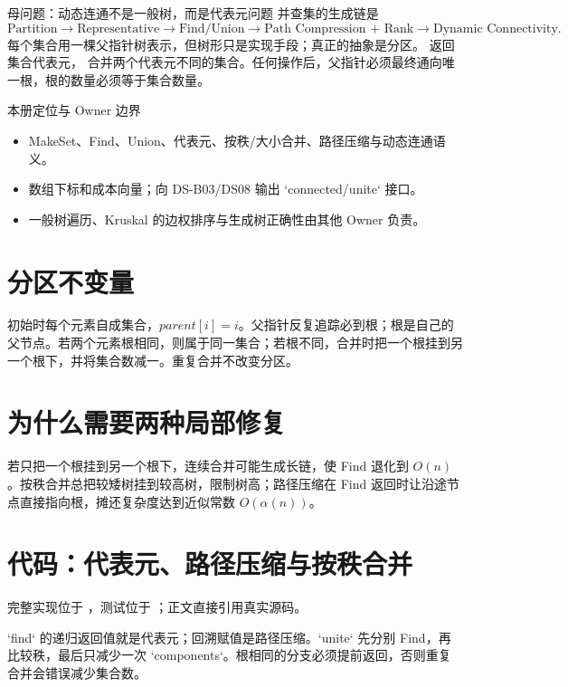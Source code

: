 \documentclass[UTF8,fontset=none,11pt,a4paper]{ctexart}
\begin{document}

\begin{corebox}{母问题：动态连通不是一般树，而是代表元问题}
并查集的生成链是
\[
\text{Partition}\to\text{Representative}\to\text{Find/Union}\to\text{Path Compression + Rank}\to\text{Dynamic Connectivity}.
\]
每个集合用一棵父指针树表示，但树形只是实现手段；真正的抽象是分区。 返回集合代表元， 合并两个代表元不同的集合。任何操作后，父指针必须最终通向唯一根，根的数量必须等于集合数量。
\end{corebox}
\begin{methodbox}{本册定位与 Owner 边界}
\begin{itemize}
\item {}MakeSet、Find、Union、代表元、按秩/大小合并、路径压缩与动态连通语义。
\item {}数组下标和成本向量；向 DS-B03/DS08 输出 `connected/unite` 接口。
\item {}一般树遍历、Kruskal 的边权排序与生成树正确性由其他 Owner 负责。
\end{itemize}
\end{methodbox}
\tableofcontents\newpage

\section{分区不变量}
初始时每个元素自成集合，$parent[i]=i$。父指针反复追踪必到根；根是自己的父节点。若两个元素根相同，则属于同一集合；若根不同，合并时把一个根挂到另一个根下，并将集合数减一。重复合并不改变分区。

\section{为什么需要两种局部修复}
若只把一个根挂到另一个根下，连续合并可能生成长链，使 Find 退化到 $O(n)$。按秩合并总把较矮树挂到较高树，限制树高；路径压缩在 Find 返回时让沿途节点直接指向根，摊还复杂度达到近似常数 $O(\alpha(n))$。

\section{代码：代表元、路径压缩与按秩合并}
完整实现位于 ，测试位于 ；正文直接引用真实源码。

`find` 的递归返回值就是代表元；回溯赋值是路径压缩。`unite` 先分别 Find，再比较秩，最后只减少一次 `components`。根相同的分支必须提前返回，否则重复合并会错误减少集合数。

\end{document}
